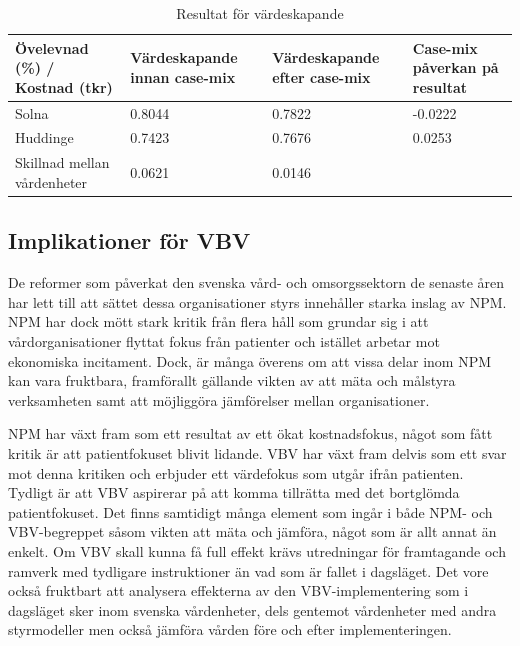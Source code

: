 \begin{table}[h]
\centering
\caption{Resultat för värdeskapande}
\label{tab:varderes}
\begin{tabular}{|p{4cm}|p{3cm}|p{2.5cm}|p{3.5cm}|}
\hline
Övelevnad (\%) / Kostnad (tkr)           & Värdeskapande innan case-mix & Värdeskapande efter case-mix & Case-mix påverkan på resultat \\ \hline
Solna                       & 0.8044                       & 0.7822                       & -0.0222                       \\ \hline
Huddinge                    & 0.7423                       & 0.7676                       & 0.0253                        \\ \hline
Skillnad mellan \linebreak vårdenheter & 0.0621                       & 0.0146                       &                               \\ \hline
\end{tabular}
\end{table}

\subsection{Implikationer för VBV}

De reformer som påverkat den svenska vård- och omsorgssektorn de senaste åren har lett till att sättet dessa organisationer styrs innehåller starka inslag av NPM. NPM har dock mött stark kritik från flera håll som grundar sig i att vårdorganisationer flyttat fokus från patienter och istället arbetar mot ekonomiska incitament. Dock, är många överens om att vissa delar inom NPM kan vara fruktbara, framförallt gällande vikten av att mäta och målstyra verksamheten samt att möjliggöra jämförelser mellan organisationer.

NPM har växt fram som ett resultat av ett ökat kostnadsfokus, något som fått kritik är att patientfokuset blivit lidande. VBV har växt fram delvis som ett svar mot denna kritiken och erbjuder ett värdefokus som utgår ifrån patienten. Tydligt är att VBV aspirerar på att komma tillrätta med det bortglömda patientfokuset. Det finns samtidigt många element som ingår i både NPM- och VBV-begreppet såsom vikten att mäta och jämföra, något som är allt annat än enkelt. Om VBV skall kunna få full effekt krävs utredningar för framtagande och ramverk med tydligare instruktioner än vad som är fallet i dagsläget. Det vore också fruktbart att analysera effekterna av den VBV-implementering som i dagsläget sker inom svenska vårdenheter, dels gentemot vårdenheter med andra styrmodeller men också jämföra vården före och efter implementeringen.

